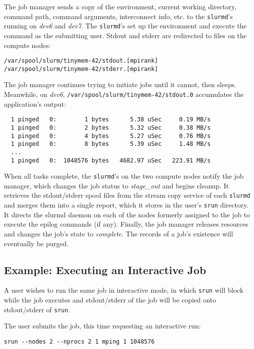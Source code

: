 The job manager sends a copy of the environment, current working directory,
command path, command arguments, interconnect info, etc.
to the {\tt slurmd}'s running on {\em dev6} and {\em dev7}.  
The {\tt slurmd}'s set up the environment and execute the command as 
the submitting user.  Stdout and stderr are redirected to files on the 
compute nodes:

\begin{verbatim}
/var/spool/slurm/tinymem-42/stdout.[mpirank]
/var/spool/slurm/tinymem-42/stderr.[mpirank]
\end{verbatim}

The job manager continues trying to initiate jobs until it cannot, then sleeps.
Meanwhile, on {\em dev6}, {\tt /var/spool/slurm/tinymem-42/stdout.0}
accumulates the application's output:

\begin{verbatim}
  1 pinged   0:        1 bytes      5.38 uSec     0.19 MB/s                     
  1 pinged   0:        2 bytes      5.32 uSec     0.38 MB/s                     
  1 pinged   0:        4 bytes      5.27 uSec     0.76 MB/s                     
  1 pinged   0:        8 bytes      5.39 uSec     1.48 MB/s                     
  ...
  1 pinged   0:  1048576 bytes   4682.97 uSec   223.91 MB/s              
\end{verbatim}

When all tasks complete, the {\tt slurmd}'s on the two compute nodes notify
the job manager, which changes the job status to {\em stage\_out} and begins cleanup.
It retrieves the stdout/stderr spool files from the stream copy service
of each {\tt slurmd} and merges them into a single report, 
which it stores in the user's {\tt srun} directory.
It directs the slurmd daemon on each of the nodes formerly assigned to the 
job to execute the epilog commands (if any).
Finally, the job manager releases resources and changes the job's state to 
{\em complete}. The records of a job's existence will eventually be purged.


\subsection{Example:  Executing an Interactive Job}

A user wishes to run the same job in interactive mode, in which {\tt srun}
will block while the job executes and stdout/stderr of the job will be 
copied onto stdout/stderr of {\tt srun}.

The user submits the job, this time requesting an interactive run:
\begin{verbatim}
srun --nodes 2 --nprocs 2 1 mping 1 1048576
\end{verbatim}

